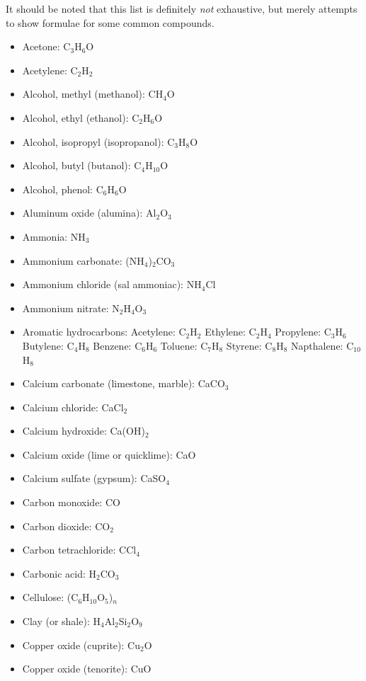 It should be noted that this list is definitely \textit{not} exhaustive, but merely attempts to show formulae for some common compounds.

\begin{itemize}
\item Acetone: C$_{3}$H$_{6}$O 
\item Acetylene: C$_{2}$H$_{2}$ 
\item Alcohol, methyl (methanol): CH$_{4}$O 
\item Alcohol, ethyl (ethanol): C$_{2}$H$_{6}$O
\item Alcohol, isopropyl (isopropanol): C$_{3}$H$_{8}$O
\item Alcohol, butyl (butanol): C$_{4}$H$_{10}$O 
\item Alcohol, phenol: C$_{6}$H$_{6}$O
\item Aluminum oxide (alumina): Al$_{2}$O$_{3}$
\item Ammonia: NH$_{3}$
\item Ammonium carbonate: (NH$_{4}$)$_{2}$CO$_{3}$
\item Ammonium chloride (sal ammoniac): NH$_{4}$Cl
\item Ammonium nitrate: N$_{2}$H$_{4}$O$_{3}$
\item Aromatic hydrocarbons: 
\subitem Acetylene: C$_{2}$H$_{2}$
\subitem Ethylene: C$_{2}$H$_{4}$
\subitem Propylene: C$_{3}$H$_{6}$
\subitem Butylene: C$_{4}$H$_{8}$
\subitem Benzene: C$_{6}$H$_{6}$
\subitem Toluene: C$_{7}$H$_{8}$
\subitem Styrene: C$_{8}$H$_{8}$
\subitem Napthalene: C$_{10}$H$_{8}$
\item Calcium carbonate (limestone, marble): CaCO$_{3}$
\item Calcium chloride: CaCl$_{2}$
\item Calcium hydroxide: Ca(OH)$_{2}$
\item Calcium oxide (lime or quicklime): CaO
\item Calcium sulfate (gypsum): CaSO$_{4}$
\item Carbon monoxide: CO
\item Carbon dioxide: CO$_{2}$
\item Carbon tetrachloride: CCl$_{4}$
\item Carbonic acid: H$_{2}$CO$_{3}$
\item Cellulose: (C$_{6}$H$_{10}$O$_{5}$)$_{n}$
\item Clay (or shale): H$_{4}$Al$_{2}$Si$_{2}$O$_{9}$
\item Copper oxide (cuprite): Cu$_{2}$O
\item Copper oxide (tenorite): CuO

\end{itemize}

